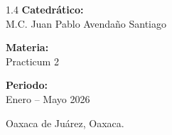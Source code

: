 \documentclass[12pt,letterpaper]{report}
\begin{document}
\begin{titlepage}
\begin{flushright}
\begin{spacing}{1.4}
			{\large \textbf{Catedrático:}} \\
			{\Large M.C. Juan Pablo Avendaño Santiago} \\ \vspace{0.6cm}
			
			{\large \textbf{Materia:}} \\
			{\Large Practicum 2} \\ \vspace{0.6cm}
			
			{\large \textbf{Periodo:}} \\
			{\Large Enero -- Mayo 2026} \\ \vspace{0.8cm}
			
			{\Large Oaxaca de Juárez, Oaxaca.}
		\end{spacing}
	\end{flushright}
	
\end{titlepage}
	
	\setcounter{tocdepth}{1} %
	\tableofcontents
	\newpage
	
	\titlespacing*{\chapter}{0pt}{3cm}{40pt}
	
	\listoffigures
	\newpage %
	
	
	
	
	
	
	
	
	
	
	
	
\end{document}
